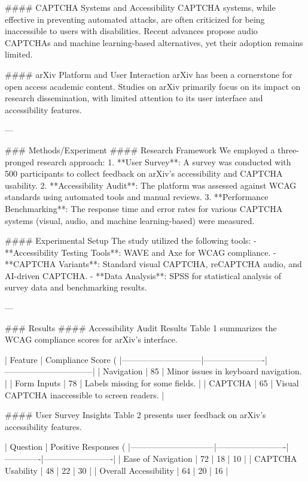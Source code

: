 #### CAPTCHA Systems and Accessibility
CAPTCHA systems, while effective in preventing automated attacks, are often criticized for being inaccessible to users with disabilities. Recent advances propose audio CAPTCHAs and machine learning-based alternatives, yet their adoption remains limited.

#### arXiv Platform and User Interaction
arXiv has been a cornerstone for open access academic content. Studies on arXiv primarily focus on its impact on research dissemination, with limited attention to its user interface and accessibility features.

---

### Methods/Experiment
#### Research Framework
We employed a three-pronged research approach:
1. **User Survey**: A survey was conducted with 500 participants to collect feedback on arXiv's accessibility and CAPTCHA usability.
2. **Accessibility Audit**: The platform was assessed against WCAG standards using automated tools and manual reviews.
3. **Performance Benchmarking**: The response time and error rates for various CAPTCHA systems (visual, audio, and machine learning-based) were measured.

#### Experimental Setup
The study utilized the following tools:
- **Accessibility Testing Tools**: WAVE and Axe for WCAG compliance.
- **CAPTCHA Variants**: Standard visual CAPTCHA, reCAPTCHA audio, and AI-driven CAPTCHA.
- **Data Analysis**: SPSS for statistical analysis of survey data and benchmarking results.

---

### Results
#### Accessibility Audit Results
Table 1 summarizes the WCAG compliance scores for arXiv's interface.

| Feature                     | Compliance Score (%
|-----------------------------|----------------------|--------------------------------|
| Navigation                  | 85                  | Minor issues in keyboard navigation. |
| Form Inputs                 | 78                  | Labels missing for some fields. |
| CAPTCHA                     | 65                  | Visual CAPTCHA inaccessible to screen readers. |

#### User Survey Insights
Table 2 presents user feedback on arXiv's accessibility features.

| Question                     | Positive Responses (%
|------------------------------|-------------------------|-------------|-------------------------|
| Ease of Navigation           | 72                     | 18          | 10                      |
| CAPTCHA Usability            | 48                     | 22          | 30                      |
| Overall Accessibility        | 64                     | 20          | 16                      |

